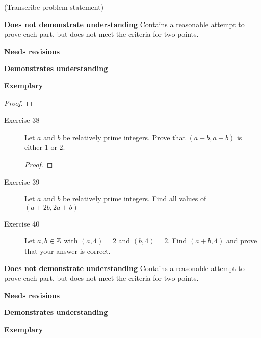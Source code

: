 \documentclass[letterpaper, 11pt]{../ximera}
\begin{document}
\begin{ex}
 (Transcribe problem statement)
\end{ex}

\begin{writeRubric}
    \item \textbf{Does not demonstrate understanding}
     Contains a reasonable attempt to prove each part, but does not meet the criteria for two points.
    \item \textbf{Needs revisions}
     
    \item \textbf{Demonstrates understanding}
    
    \item \textbf{Exemplary}
        
\end{writeRubric}
                                       \begin{proof}
 
\end{proof}

\begin{ex}
 
\begin{description}%
\item[Exercise 38] Let $a$ and $b$ be relatively prime integers. Prove that $(a+b,a-b)$ is either $1$ or $2$.
	\begin{proof}
 		
	\end{proof}

\item[Exercise 39] Let $a$ and $b$ be relatively prime integers. Find all values of $(a+2b,2a+b)$
	\begin{solution}
 		
	\end{solution}
 
\item[Exercise 40] Let $a,b\in\mathbb Z$ with $(a,4)=2$ and $(b,4)=2$. Find $(a+b,4)$ and prove that your answer is correct.
	\begin{solution}
 		
	\end{solution} 
\end{description}
\end{ex}

\begin{writeRubric}
    \item \textbf{Does not demonstrate understanding}
     Contains a reasonable attempt to prove each part, but does not meet the criteria for two points.
    \item \textbf{Needs revisions}
     
    \item \textbf{Demonstrates understanding}
    
    \item \textbf{Exemplary}
        
\end{writeRubric}
                                       
\end{document}
